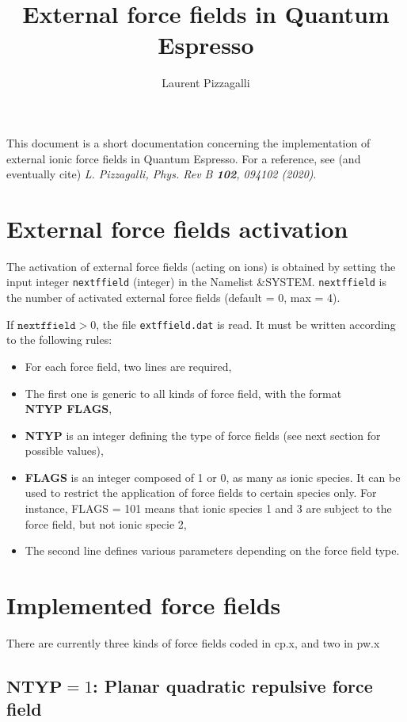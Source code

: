 \documentclass[a4paper,12pt,notitlepage]{article}
\author{Laurent Pizzagalli}
\begin{document}
\title{External force fields in Quantum Espresso}
%
\maketitle

This document is a short documentation concerning the implementation of external ionic force fields in Quantum Espresso. For a reference, see (and eventually cite) \textit{L. Pizzagalli, Phys. Rev B \textbf{102}, 094102 (2020)}. 

\section{External force fields activation}

The activation of external force fields (acting on ions) is obtained by  
setting the input integer \texttt{nextffield} (integer) in the Namelist \&SYSTEM. \texttt{nextffield} is the number of activated external force fields (default = 0, max = 4). 

\medskip 
\noindent If $\mathtt{nextffield} > 0$, the file \texttt{extffield.dat} is read. It must be written according to the following rules: 
\begin{itemize}
\item For each force field, two lines are required,
\item The first one is generic to all kinds of force field, with the format \\ \textbf{NTYP  FLAGS},
\item \textbf{NTYP} is an integer defining the type of force fields (see next section for possible values),
\item \textbf{FLAGS} is an integer composed of 1 or 0, as many as ionic species. It can be used to restrict the application of force fields to certain species only. For instance, FLAGS = 101 means that ionic species 1 and 3 are subject to the force field, but not ionic specie 2,
\item The second line defines various parameters depending on the force field type.
\end{itemize}

\section{Implemented force fields}

There are currently three kinds of force fields coded in cp.x, and two in pw.x

\subsection{$\mathbf{NTYP} = 1$: Planar quadratic repulsive force field}
\end{document}
